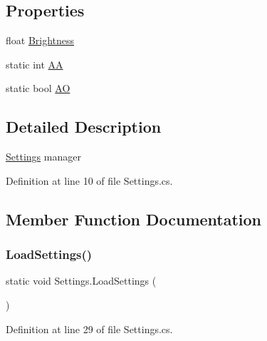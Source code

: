 \subsection*{Properties}
\begin{DoxyCompactItemize}
\item 
float \mbox{\hyperlink{class_settings_a86a333469505eeb5f5313df5855487bf}{Brightness}}
\item 
static int \mbox{\hyperlink{class_settings_a2580e9c01faa1e2b24ec86adabdd3f4c}{AA}}
\item 
static bool \mbox{\hyperlink{class_settings_ae83f45bca825b6f2ffb6a93b6f407897}{AO}}
\end{DoxyCompactItemize}


\subsection{Detailed Description}
\mbox{\hyperlink{class_settings}{Settings}} manager 



Definition at line 10 of file Settings.\+cs.



\subsection{Member Function Documentation}
\mbox{\label{class_settings_a7189b690954cfc6feb994aeb230c39f8}} 
\subsubsection{\texorpdfstring{Load\+Settings()}{LoadSettings()}}
{\footnotesize\ttfamily static void Settings.\+Load\+Settings (\begin{DoxyParamCaption}{ }\end{DoxyParamCaption})\hspace{0.3cm}{\ttfamily [static]}}



Definition at line 29 of file Settings.\+cs.



